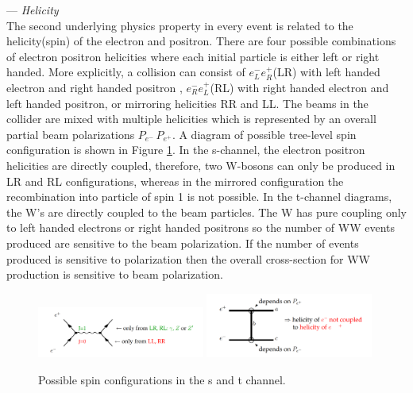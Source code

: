 --- \textit{Helicity}\\
The second underlying physics property in every event is related to the helicity(spin) of the electron and positron. There are four possible combinations of electron positron helicities where each initial particle is either left or right handed. More explicitly, a collision can consist of  $e^-_L e^+_R$(LR) with left handed electron and right handed positron , $e^-_R e^+_L$(RL)  with right handed electron and left handed positron, or mirroring helicities RR and LL.  The beams in the collider are mixed with multiple helicities which is represented by an overall partial beam polarizations $P_{e^-} \, P_{e^+}$. A diagram of possible tree-level spin configuration is shown in Figure \ref{fig:spindiag}. In the s-channel, the electron positron helicities  are directly coupled, therefore, two W-bosons can only be produced in LR and RL configurations, whereas in the mirrored configuration the  recombination into particle of spin 1 is  not possible. In the t-channel diagrams, the W's are directly coupled to the beam particles. The W has pure coupling only to left handed electrons or right handed positrons so the number of  WW events produced are sensitive to the beam polarization\cite{thomson}.  If the number of events produced is sensitive to polarization then the overall cross-section for WW production is sensitive to beam polarization. 

\begin{figure}
\label{fig:spindiag}
\includegraphics[width=0.49\textwidth]{helicity1.pdf}
\includegraphics[width=0.49\textwidth]{helicity2.pdf}
\caption{Possible spin configurations in the s and t channel. \cite{helicity}}
\end{figure}


